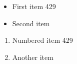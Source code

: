 \documentclass{article}
\begin{document}
\begin{itemize}
\item First item 429
\item Second item
\end{itemize}
\begin{enumerate}
\item Numbered item 429
\item Another item
\end{enumerate}
\end{document}
